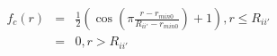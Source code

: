 \documentclass[24pt]{article}
\begin{document}
\begin{eqnarray*}
\label{eqn:f_c}
f_c(r)  & = & \frac{1}{2}(\cos(\pi \frac{r-r_{min0}}{R_{ii'}-r_{min0}}) + 1), r \leq R_{ii'} \\
& = & 0,  r > R_{ii'}
\end{eqnarray*}
\end{document}
